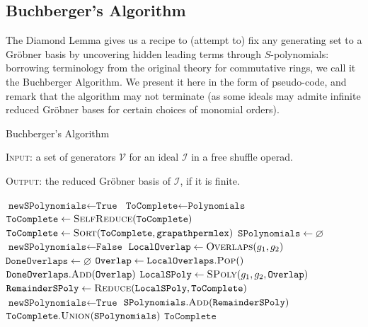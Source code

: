 \documentclass[fleqn, a4paper, twoside]{article}
\newcommand{\0}{\langle 0\rangle}
\newcommand{\II}{\mathcal{I}}
\DeclareRobustCommand{\[}{\begin{equation}}%
\DeclareRobustCommand{\]}{\end{equation}}%
\theoremstyle{mytheorem}
\theoremstyle{introthm}
\theoremstyle{mydefinition}
\theoremstyle{mydefinition2}
\theoremstyle{plain} %
\newcommand{\?}{\,?\,}
\theoremstyle{mytheorem}
\theoremstyle{plain} %
\begin{document}
\subsection{Buchberger's Algorithm}

The Diamond Lemma gives us a recipe to (attempt to) fix any 
generating set to a Gr\"obner basis by uncovering hidden
leading terms through $S$-polynomials: borrowing terminology
from the original theory for commutative rings, we call it
the Buchberger Algorithm. We present it here in the form
of pseudo-code, and remark that the algorithm may not
terminate (as some ideals may admite infinite reduced 
Gr\"obner bases for certain choices of monomial orders).

 \begin{algorithm}
\caption{Buchberger's Algorithm}\label{algo:self-reduce}
\textsc{Input:} a set of generators $\mathcal V$ for an ideal $\II$
in a free shuffle operad.

\textsc{Output:} the reduced Gr\"obner basis of $\II$,
if it is finite.

\begin{adjustwidth}{0 cm}{2 cm}
\begin{algorithmic}[1]
	\State $\texttt{newSPolynomials} \gets \texttt{True}$
	\State $\texttt{ToComplete} \gets \texttt{Polynomials}$
		\State $\texttt{ToComplete} \gets 
					\textsc{SelfReduce}(\texttt{ToComplete})$
		\State $\texttt{ToComplete} 
					\gets \textsc{Sort}(\texttt{ToComplete},
								\texttt{grapathpermlex})$
		\State $\texttt{SPolynomials} \gets \varnothing$
		\State $\texttt{newSPolynomials} \gets \texttt{False}$
			\State $\texttt{LocalOverlap}\gets
			 \textsc{Overlaps}(g_1,g_2)$
			 \State $\texttt{DoneOverlaps} \gets \varnothing$
			\State $\texttt{Overlap} \gets 	
				\texttt{LocalOverlaps}.\textsc{Pop}()$
			\State $\texttt{DoneOverlaps}.\textsc{Add}(\texttt{Overlap})$
			\State $\texttt{LocalSPoly} \gets 
				\textsc{SPoly}(g_1,g_2,\texttt{Overlap}) $
			\State $\texttt{RemainderSPoly} \gets \textsc{Reduce}(
			\texttt{LocalSPoly},\texttt{ToComplete})$
				\State $\texttt{newSPolynomials} 
					\gets \texttt{True}$
				\State $\texttt{SPolynomials}.
					\textsc{Add}(\texttt{RemainderSPoly})$
				\EndIf
				\EndWhile
			\EndFor
			\State  
				$\texttt{ToComplete}.\textsc{Union}(\texttt{SPolynomials})$
\EndWhile
\State \Return $\texttt{ToComplete}$
\EndProcedure
\end{algorithmic}
\end{adjustwidth}
\end{algorithm}
\end{document}
